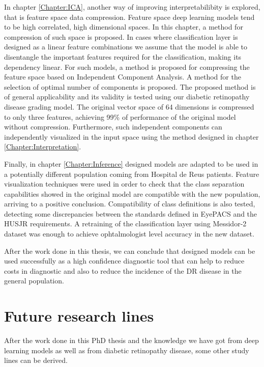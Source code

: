 In chapter \ref{Chapter:ICA}, another way of improving interpretabilibity is explored, that is feature space data compression. Feature space deep learning models tend to be high correlated, high dimensional spaces. In this chapter, a method for compression of such space is proposed. In cases where classification layer is designed as a linear feature combinations we assume that the model is able to disentangle the important features required for the classification, making its dependency linear. For such models, a method is proposed for compressing the feature space based on Independent Component Analysis. A method for the selection of optimal number of components is proposed. The proposed method is of general applicability and its validity is tested using our diabetic retinopathy disease grading model. The original vector space of 64 dimensions is compressed to only three features, achieving 99\% of performance of the original model without compression. Furthermore, such independent components can independently visualized in the input space using the method designed in chapter \ref{Chapter:Interpretation}.

Finally, in chapter \ref{Chapter:Inference} designed models are adapted to be used in a potentially different population coming from Hospital de Reus patients. Feature visualization techniques were used in order to check that the class separation capabilities showed in the original model are compatible with the new population, arriving to a positive conclusion. Compatibility of class definitions is also tested, detecting some discrepancies between the standards defined in EyePACS and the HUSJR requirements. A retraining of the classification layer using Messidor-2 dataset was enough to achieve ophtalmologist level accuracy in the new dataset. 

After the work done in this thesis, we can conclude that designed models can be used successfully as a high confidence diagnostic tool that can help to reduce costs in diagnostic and also to reduce the incidence of the DR disease in the general population.

\vspace{1cm} 

\section{Future research lines}

After the work done in this PhD thesis and the knowledge we have got from deep learning models as well as from diabetic retinopathy disease, some other study lines can be derived. 

